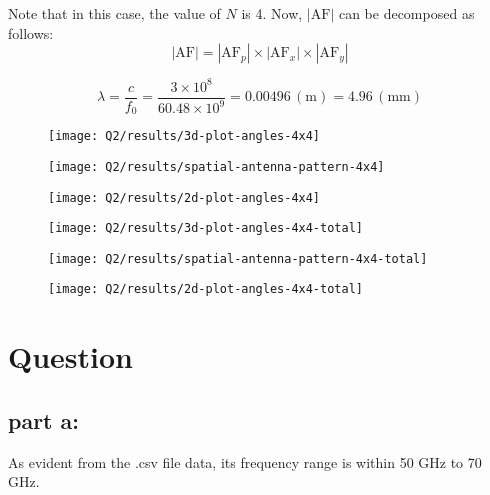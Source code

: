 \documentclass[12pt,onecolumn,a4paper]{article}
\newcommand\question{
	\section{Question \numberstringnum{\thesection}}
}
\begin{document}
	Note that in this case, the value of $N$ is 4.
	Now, $|\text{AF}| $ can be decomposed as follows:
	\begin{equation}
		|\text{AF}| = |\text{AF}_p| \times |\text{AF}_x| \times |\text{AF}_y|
	\end{equation}
	
	
	\begin{equation}
		\lambda = \frac{c}{f_0} = \frac{3 \times 10^8}{60.48 \times 10^9} = 0.00496 \, (\mathrm{m}) = 4.96 \, (\mathrm{mm})
	\end{equation}

	\begin{figure}[H]
		\centering
		\texttt{[image: Q2/results/3d-plot-angles-4x4]}
		\caption{}
		\label{fig:3d-plot-angles-4x4}
	\end{figure}
	
	\begin{figure}[H]
		\centering
		\texttt{[image: Q2/results/spatial-antenna-pattern-4x4]}
		\caption{}
		\label{fig:spatial-antenna-pattern-4x4}
	\end{figure}
	\begin{figure}[H]
		\centering
		\texttt{[image: Q2/results/2d-plot-angles-4x4]}
		\caption{}
		\label{fig:2d-plot-angles-4x4}
	\end{figure}
	
\begin{figure}[H]
	\centering
	\texttt{[image: Q2/results/3d-plot-angles-4x4-total]}
	\caption{}
	\label{fig:3d-plot-angles-4x4-total}
\end{figure}
\begin{figure}[H]
	\centering
	\texttt{[image: Q2/results/spatial-antenna-pattern-4x4-total]}
	\caption{}
	\label{fig:spatial-antenna-pattern-4x4-total}
\end{figure}
\begin{figure}[H]
	\centering
	\texttt{[image: Q2/results/2d-plot-angles-4x4-total]}
	\caption{}
	\label{fig:2d-plot-angles-4x4-total}
\end{figure}


	\FloatBarrier
	\question%

	
	\FloatBarrier
	\subsection{part a:}
	As evident from the .csv file data, its frequency range is within 50 GHz to 70 GHz.
	
\end{document}
